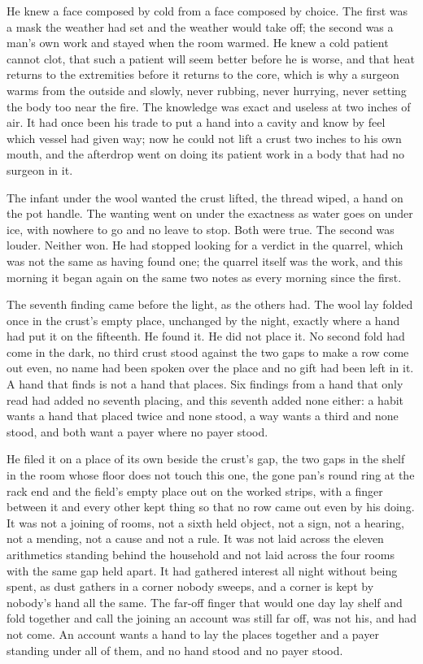 He knew a face composed by cold from a face composed by choice. The first was a mask the weather had set and the weather would take off; the second was a man's own work and stayed when the room warmed. He knew a cold patient cannot clot, that such a patient will seem better before he is worse, and that heat returns to the extremities before it returns to the core, which is why a surgeon warms from the outside and slowly, never rubbing, never hurrying, never setting the body too near the fire. The knowledge was exact and useless at two inches of air. It had once been his trade to put a hand into a cavity and know by feel which vessel had given way; now he could not lift a crust two inches to his own mouth, and the afterdrop went on doing its patient work in a body that had no surgeon in it.

The infant under the wool wanted the crust lifted, the thread wiped, a hand on the pot handle. The wanting went on under the exactness as water goes on under ice, with nowhere to go and no leave to stop. Both were true. The second was louder. Neither won. He had stopped looking for a verdict in the quarrel, which was not the same as having found one; the quarrel itself was the work, and this morning it began again on the same two notes as every morning since the first.

\scenebreak

The seventh finding came before the light, as the others had. The wool lay folded once in the crust's empty place, unchanged by the night, exactly where a hand had put it on the fifteenth. He found it. He did not place it. No second fold had come in the dark, no third crust stood against the two gaps to make a row come out even, no name had been spoken over the place and no gift had been left in it. A hand that finds is not a hand that places. Six findings from a hand that only read had added no seventh placing, and this seventh added none either: a habit wants a hand that placed twice and none stood, a way wants a third and none stood, and both want a payer where no payer stood.

He filed it on a place of its own beside the crust's gap, the two gaps in the shelf in the room whose floor does not touch this one, the gone pan's round ring at the rack end and the field's empty place out on the worked strips, with a finger between it and every other kept thing so that no row came out even by his doing. It was not a joining of rooms, not a sixth held object, not a sign, not a hearing, not a mending, not a cause and not a rule. It was not laid across the eleven arithmetics standing behind the household and not laid across the four rooms with the same gap held apart. It had gathered interest all night without being spent, as dust gathers in a corner nobody sweeps, and a corner is kept by nobody's hand all the same. The far-off finger that would one day lay shelf and fold together and call the joining an account was still far off, was not his, and had not come. An account wants a hand to lay the places together and a payer standing under all of them, and no hand stood and no payer stood.

